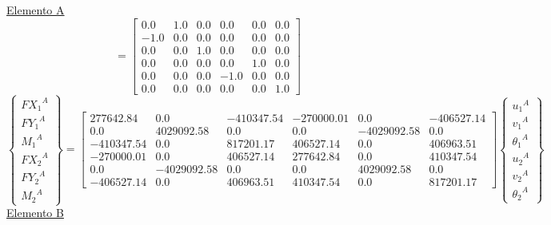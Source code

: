 \documentclass[a4paper]{article}
\begin{document}
\underline{Elemento A}
\\
{
\renewcommand{\arraystretch}{1.7}
\begin{equation}
[T^*_A]=
    \left[\begin{matrix}0.0 & 1.0 & 0.0 & 0.0 & 0.0 & 0.0\\-1.0 & 0.0 & 0.0 & 0.0 & 0.0 & 0.0\\0.0 & 0.0 & 1.0 & 0.0 & 0.0 & 0.0\\0.0 & 0.0 & 0.0 & 0.0 & 1.0 & 0.0\\0.0 & 0.0 & 0.0 & -1.0 & 0.0 & 0.0\\0.0 & 0.0 & 0.0 & 0.0 & 0.0 & 1.0\end{matrix}\right]
\end{equation}
\begin{equation}
\left\{ \begin{array}{c}
{FX_1}^A \\ {FY_1}^A \\ {M_1}^A \\
{FX_2}^A  \\ {FY_2}^A \\ {M_2}^A 
\end{array} \right\} = 
\left[\begin{matrix}277642.84 & 0.0 & -410347.54 & -270000.01 & 0.0 & -406527.14\\0.0 & 4029092.58 & 0.0 & 0.0 & -4029092.58 & 0.0\\-410347.54 & 0.0 & 817201.17 & 406527.14 & 0.0 & 406963.51\\-270000.01 & 0.0 & 406527.14 & 277642.84 & 0.0 & 410347.54\\0.0 & -4029092.58 & 0.0 & 0.0 & 4029092.58 & 0.0\\-406527.14 & 0.0 & 406963.51 & 410347.54 & 0.0 & 817201.17\end{matrix}\right]
\left\{ \begin{array}{c}
{u_1}^A \\ {v_1}^A \\ {{\theta}_1}^A \\
{u_2}^A  \\ {v_2}^A \\ {{\theta}_2}^A 
\end{array} \right\}
\end{equation}
}
\underline{Elemento B}
\\
\end{document}
